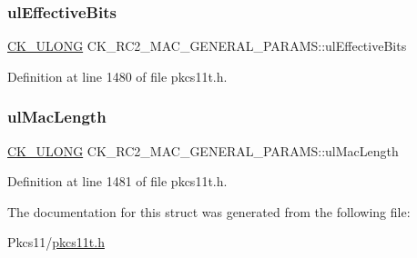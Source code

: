 \subsubsection{\texorpdfstring{ul\+Effective\+Bits}{ulEffectiveBits}}
{\footnotesize\ttfamily \hyperlink{pkcs11t_8h_a35181858a3b7a0a81f49d180d8f446ef}{C\+K\+\_\+\+U\+L\+O\+NG} C\+K\+\_\+\+R\+C2\+\_\+\+M\+A\+C\+\_\+\+G\+E\+N\+E\+R\+A\+L\+\_\+\+P\+A\+R\+A\+M\+S\+::ul\+Effective\+Bits}



Definition at line 1480 of file pkcs11t.\+h.

\mbox{\label{struct_c_k___r_c2___m_a_c___g_e_n_e_r_a_l___p_a_r_a_m_s_afb7e767a2898dbb3a13e86a2799fc5b5}} 
\subsubsection{\texorpdfstring{ul\+Mac\+Length}{ulMacLength}}
{\footnotesize\ttfamily \hyperlink{pkcs11t_8h_a35181858a3b7a0a81f49d180d8f446ef}{C\+K\+\_\+\+U\+L\+O\+NG} C\+K\+\_\+\+R\+C2\+\_\+\+M\+A\+C\+\_\+\+G\+E\+N\+E\+R\+A\+L\+\_\+\+P\+A\+R\+A\+M\+S\+::ul\+Mac\+Length}



Definition at line 1481 of file pkcs11t.\+h.



The documentation for this struct was generated from the following file\+:\begin{DoxyCompactItemize}
\item 
Pkcs11/\hyperlink{pkcs11t_8h}{pkcs11t.\+h}\end{DoxyCompactItemize}
